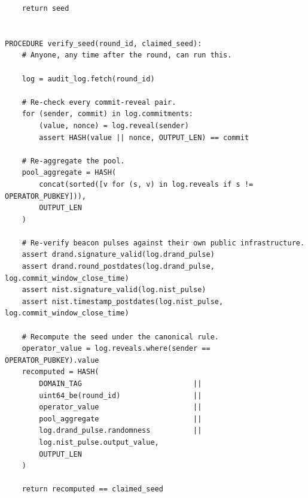 \documentclass[11pt]{article}
\begin{document}
\begin{lstlisting}
    return seed


PROCEDURE verify_seed(round_id, claimed_seed):
    # Anyone, any time after the round, can run this.

    log = audit_log.fetch(round_id)

    # Re-check every commit-reveal pair.
    for (sender, commit) in log.commitments:
        (value, nonce) = log.reveal(sender)
        assert HASH(value || nonce, OUTPUT_LEN) == commit

    # Re-aggregate the pool.
    pool_aggregate = HASH(
        concat(sorted([v for (s, v) in log.reveals if s != OPERATOR_PUBKEY])),
        OUTPUT_LEN
    )

    # Re-verify beacon pulses against their own public infrastructure.
    assert drand.signature_valid(log.drand_pulse)
    assert drand.round_postdates(log.drand_pulse, log.commit_window_close_time)
    assert nist.signature_valid(log.nist_pulse)
    assert nist.timestamp_postdates(log.nist_pulse, log.commit_window_close_time)

    # Recompute the seed under the canonical rule.
    operator_value = log.reveals.where(sender == OPERATOR_PUBKEY).value
    recomputed = HASH(
        DOMAIN_TAG                          ||
        uint64_be(round_id)                 ||
        operator_value                      ||
        pool_aggregate                      ||
        log.drand_pulse.randomness          ||
        log.nist_pulse.output_value,
        OUTPUT_LEN
    )

    return recomputed == claimed_seed
\end{lstlisting}
\end{document}
